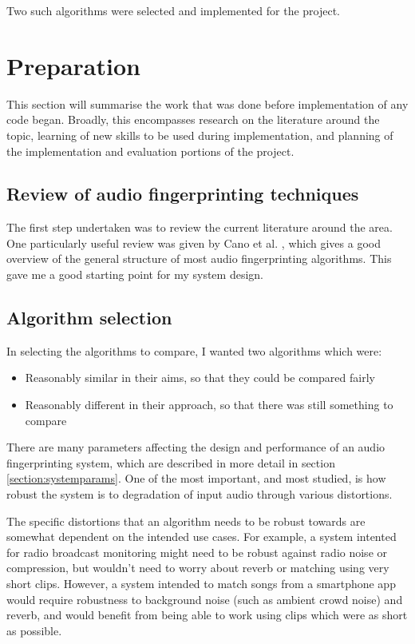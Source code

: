 \documentclass[12pt,a4paper,twoside,openright]{report}
\begin{document}
Two such algorithms were selected and implemented for the project.



\chapter{Preparation}

This section will summarise the work that was done before implementation of any code began. Broadly, this encompasses research on the literature around the topic, learning of new skills to be used during implementation, and planning of the implementation and evaluation portions of the project.


\section{Review of audio fingerprinting techniques}

The first step undertaken was to review the current literature around the area. One particularly useful review was given by Cano et al. \cite{Cano02}, which gives a good overview of the general structure of most audio fingerprinting algorithms. This gave me a good starting point for my system design.


\section{Algorithm selection}
\label{section:algoselection}

In selecting the algorithms to compare, I wanted two algorithms which were:

\begin{itemize}
  \item Reasonably similar in their aims, so that they could be compared fairly
  \item Reasonably different in their approach, so that there was still something to compare
\end{itemize}

There are many parameters affecting the design and performance of an audio fingerprinting system, which are described in more detail in section \ref{section:systemparams}. One of the most important, and most studied, is how robust the system is to degradation of input audio through various distortions. 

The specific distortions that an algorithm needs to be robust towards are somewhat dependent on the intended use cases. For example, a system intented for radio broadcast monitoring might need to be robust against radio noise or compression, but wouldn't need to worry about reverb or matching using very short clips. However, a system intended to match songs from a smartphone app would require robustness to background noise (such as ambient crowd noise) and reverb, and would benefit from being able to work using clips which were as short as possible.
\end{document}
